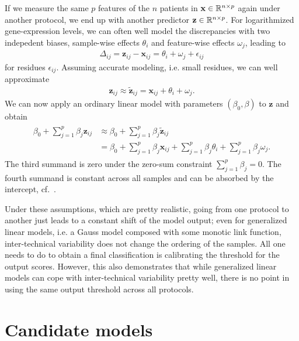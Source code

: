 If we 
measure the same $p$ features of the $n$ patients in $\mathbf{x} \in \mathbb{R}^{n \times p}$ again under 
another protocol, we end up with another predictor 
$\mathbf{z} \in \mathbb{R}^{n \times p}$.
For logarithmized gene-expression levels,
we can often well model the discrepancies with two indepedent biases, sample-wise effects $\theta_i$
and feature-wise effects $\omega_j$, leading to
\begin{align}\label{eq:inter-tech-exact}
    \Delta_{ij} = \mathbf{z}_{ij} - \mathbf{x}_{ij} = \theta_i + \omega_j + \epsilon_{ij}
\end{align}
for residues $\epsilon_{ij}$. Assuming accurate modeling, i.e. small residues, we can well approximate
\begin{align}
    \mathbf{z}_{ij} \approx \tilde{\mathbf{z}}_{ij} = \mathbf{x}_{ij} + \theta_i + \omega_j.
\end{align}
We can now apply an ordinary linear model with parameters $(\beta_0, \beta)$ to $\mathbf{z}$ 
and obtain
\begin{align} \label{eq:inter-tech}
\begin{split}
    \beta_0 + \sum_{j=1}^p \beta_j \mathbf{z}_{ij} &\approx \beta_0 + \sum_{j=1}^p \beta_j \tilde{\mathbf{z}}_{ij} \\
    &= \beta_0 + \sum_{j=1}^p \beta_j \mathbf{x}_{ij} + \sum_{j=1}^p \beta_j \theta_i + \sum_{j=1}^p \beta_j \omega_j.
\end{split}
\end{align}
The third summand is zero under the zero-sum constraint $\sum_{j = 1}^p \beta_j = 0$. The fourth 
summand is constant across all samples and can be absorbed by the intercept, cf.\ 
\cite{transplatform17}. 

Under these assumptions, which are pretty realistic,
going from one protocol to another just leads to a constant shift of the model 
output; even for generalized linear models, i.e. a Gauss model composed with some monotic link function,
inter-technical variability does not change the ordering of the samples. All one needs to do to 
obtain a final classification is calibrating the threshold for the output scores. However, this 
also demonstrates that while generalized linear models can cope with inter-technical variability 
pretty well, there is no point in using the same output threshold across all protocols.

\section{Candidate models}\label{sec:candidate-models}

